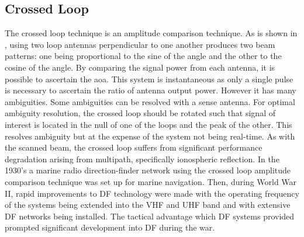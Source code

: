 \subsection{Crossed Loop}
The crossed loop technique is an amplitude comparison technique. 
As is shown in , using two loop antennas perpendicular to one another produces two beam patterns: one being proportional to the sine of the angle and the other to the cosine of the angle. 
By comparing the signal power from each antenna, it is possible to ascertain the \gls{aoa}. This system is instantaneous as only a single pulse is necessary to ascertain the ratio of antenna output power. However it has many ambiguities. Some ambiguities can be resolved with a sense antenna. 
For optimal ambiguity resolution, the crossed loop should be rotated such that signal of interest is located in the null of one of the loops and the peak of the other. This resolves ambiguity but at the expense of the system not being real-time.
As with the scanned beam, the crossed loop suffers from significant performance degradation arising from multipath, specifically ionospheric reflection. 
In the 1930's a marine radio direction-finder network using the crossed loop amplitude comparison technique was set up for marine navigation. Then, during World War II, rapid improvements to DF technology were made with the operating frequency of the systems being extended into the VHF and UHF band and with extensive DF networks being installed\cite{jenkins1991smallaperture}. The tactical advantage which DF systems provided prompted significant development into DF during the war.
